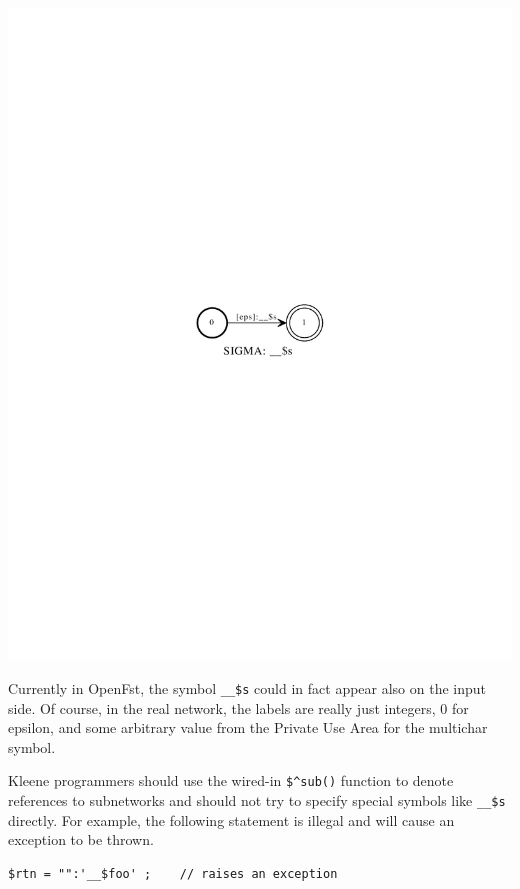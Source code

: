 \documentclass[letterpaper,12pt]{article}
\begin{document}
\begin{center}
\includegraphics{images/reference.pdf}
\end{center}

\noindent
Currently in OpenFst, the symbol \verb!__$s! could in fact appear also on
the input side.  Of course, in the real network, the labels are really
just integers, 0 for epsilon, and some arbitrary value from the Private
Use Area for the multichar symbol.

Kleene programmers should use the wired-in \verb!$^sub()! function to
denote references to subnetworks and should not try to specify special
symbols like \verb!__$s! directly.  For example, the following statement
is illegal and will cause an exception to be thrown.

\begin{Verbatim}[fontsize=\small]
$rtn = "":'__$foo' ;    // raises an exception
\end{Verbatim}
\end{document}
